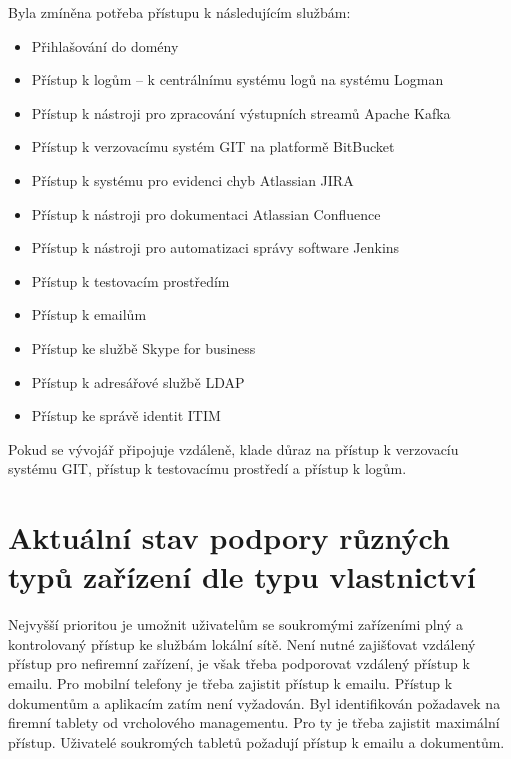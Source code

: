 Byla zmíněna potřeba přístupu k následujícím službám:
\begin{itemize}
    \item Přihlašování do domény
    \item Přístup k logům -- k centrálnímu systému logů na systému Logman
    \item Přístup k nástroji pro zpracování výstupních streamů Apache Kafka
    \item Přístup k verzovacímu systém GIT na platformě BitBucket
    \item Přístup k systému pro evidenci chyb Atlassian JIRA
    \item Přístup k nástroji pro dokumentaci Atlassian Confluence
    \item Přístup k nástroji pro automatizaci správy software Jenkins
    \item Přístup k testovacím prostředím
    \item Přístup k emailům 
    \item Přístup ke službě Skype for business
    \item Přístup k adresářové službě LDAP
    \item Přístup ke správě identit ITIM
\end{itemize}

Pokud se vývojář připojuje vzdáleně, klade důraz na přístup k verzovacíu systému GIT, přístup k testovacímu prostředí a přístup k logům.

\section{Aktuální stav podpory různých typů zařízení dle typu vlastnictví}


Nejvyšší prioritou je umožnit uživatelům se soukromými zařízeními plný a kontrolovaný přístup ke službám lokální sítě. Není nutné zajišťovat vzdálený přístup pro nefiremní zařízení, je však třeba podporovat vzdálený přístup k emailu. Pro mobilní telefony je třeba zajistit přístup k emailu. Přístup k dokumentům a aplikacím zatím není vyžadován. Byl identifikován požadavek na firemní tablety od vrcholového managementu. Pro ty je třeba zajistit maximální přístup. Uživatelé soukromých tabletů požadují přístup k emailu a dokumentům.

